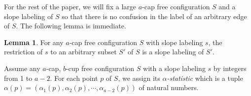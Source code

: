 \documentclass{amsart}
\theoremstyle{definition}
\newtheorem{lemma}[thm]{Lemma}
\numberwithin{thm}{section}
\begin{document}

For the rest of the paper, we will fix a large $a$-cap free configuration $S$
and a slope labeling of $S$ so that there is no confusion in the label of an arbitrary edge of $S$.
The following lemma is immediate.
\begin{lemma}
For any $a$-cap free configuration $S$ with slope labeling $s$, the restriction of $s$ to an arbitrary subset $S'$ of $S$ is a slope labeling of $S'$.
\end{lemma}

Assume any $a$-cap, $b$-cup free configuration $S$ with a slope labeling $s$ by integers from 1 to $a-2$. 
For each point $p$ of $S$, we assign its \emph{$\alpha$-statistic} which is a tuple $\alpha(p) = (\alpha_1(p), \alpha_2(p), \cdots, \alpha_{a-2}(p))$ of natural numbers.
\end{document}

